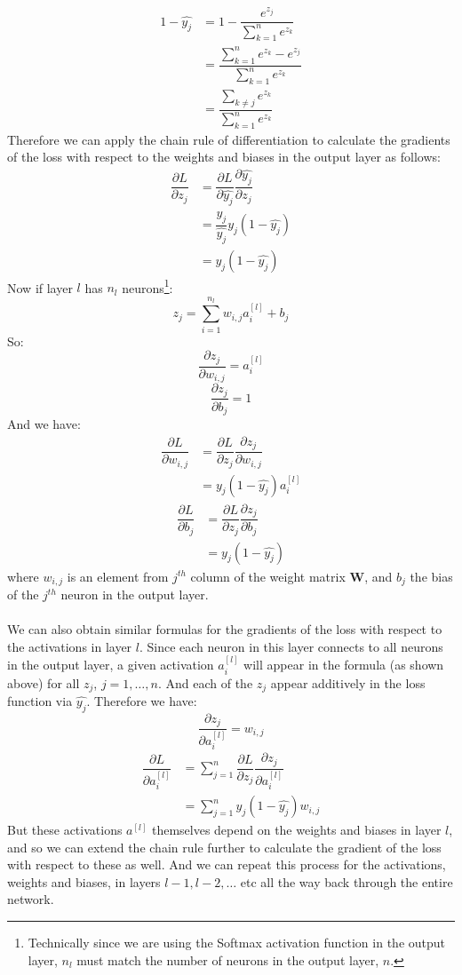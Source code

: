 \documentclass[11pt]{article} %
\theoremstyle{plain}
\theoremstyle{definition}
\begin{document}
\begin{align*}
1-\hat{y_j} &= 1 - \dfrac{e^{z_j}}{\sum_{k=1}^n e^{z_k}} \\
&= \dfrac {\sum_{k=1}^n e^{z_k} - e^{z_j}}{\sum_{k=1}^n e^{z_k}} \\
&= \dfrac {\sum_{k \neq j} e^{z_k}}{\sum_{k=1}^n e^{z_k}}
\end{align*}
Therefore we can apply the chain rule of differentiation to calculate the gradients of the loss with respect to the weights and biases in the output layer as follows:
\begin{align*}
\dfrac{\partial L}{\partial z_j} &= \dfrac{\partial L}{\partial \hat{y_j}} \dfrac{\partial \hat{y_j}}{\partial z_j} \\
&= \dfrac {y_j}{\hat{y_j}} \hat{y_j}(1-\hat{y_j}) \\
&= y_j(1-\hat{y_j})
\end{align*}
Now if layer \(l\) has \(n_l\) neurons\footnote{Technically since we are using the Softmax activation function in the output layer, \(n_l\) must match the number of neurons in the output layer, \(n\).}:
\[ z_j = \sum_{i=1}^{n_l} w_{i,j}a^{[l]}_i + b_j\]
So:
\[ \dfrac{\partial z_j}{\partial w_{i,j}} = a^{[l]}_i \]
\[ \dfrac{\partial z_j}{\partial b_j} = 1 \]
And we have:
\begin{align*}
\dfrac{\partial L}{\partial w_{i,j}} &= \dfrac{\partial L}{\partial z_j}\dfrac{\partial z_j}{\partial w_{i,j}} \\
&= y_j(1-\hat{y_j})a^{[l]}_i
\end{align*}
\begin{align*}
\dfrac{\partial L}{\partial b_j} &= \dfrac{\partial L}{\partial z_j}\dfrac{\partial z_j}{\partial b_j} \\
&= y_j(1-\hat{y_j})
\end{align*}
where \(w_{i,j}\) is an element from \(j^{th}\) column of the weight matrix \(\mathbf{W}\), and \(b_j\) the bias of the \(j^{th}\) neuron in the output layer. 
\\
\\
\noindent
We can also obtain similar formulas for the gradients of the loss with respect to the activations in layer \(l\). Since each neuron in this layer connects to all neurons in the output layer, a given activation \(a^{[l]}_i\) will appear in the formula (as shown above) for all \(z_j\), \(j=1,\ldots,n\). And each of the \(z_j\) appear additively in the loss function via $\hat{y_j}$. Therefore we have:
\[ \dfrac{\partial z_j}{\partial a^{[l]}_i} = w_{i,j}\]
\begin{align*}
\dfrac{\partial L}{\partial a^{[l]}_i} &= \sum_{j=1}^{n} \dfrac{\partial L}{\partial z_j}\dfrac{\partial z_j}{\partial a^{[l]}_i} \\
&= \sum_{j=1}^{n} y_j(1-\hat{y_j})w_{i,j}
\end{align*}
But these activations \(a^{[l]}\) themselves depend on the weights and biases in layer \(l\), and so we can extend the chain rule further to calculate the gradient of the loss with respect to these as well. And we can repeat this process for the activations, weights and biases, in layers \({l-1}, {l-2}, \ldots \) etc all the way back through the entire network.   
\end{document}
